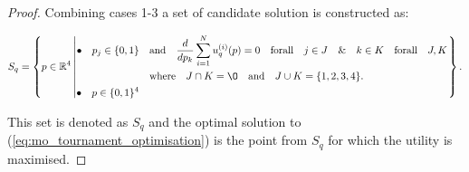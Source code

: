 \begin{proof}
Combining cases 1-3 a set of candidate solution is constructed as:

\begin{equation*}
    S_q =
    \left\{p \in \mathbb{R} ^ 4 \left|
        \begin{aligned}
            \bullet\quad p_j \in \{0, 1\} & \quad \text{and} \quad \frac{d}{dp_k} 
            \sum\limits_{i=1} ^ N  u_q^{(i)}(p) = 0
            \quad \text{forall} \quad j \in J \quad \&  \quad k \in K  \quad \text{forall} \quad J, K \\
            & \quad \text{where} \quad J \cap K = \O \quad
            \text{and} \quad J \cup K = \{1, 2, 3, 4\}.\\
            \bullet\quad  p \in \{0, 1\} ^ 4
        \end{aligned}\right.
    \right\}.
\end{equation*}

This set is denoted as $S_q$ and the optimal solution to
(\ref{eq:mo_tournament_optimisation}) is the point from $S_q$ for which the
utility is maximised.






\end{proof}
